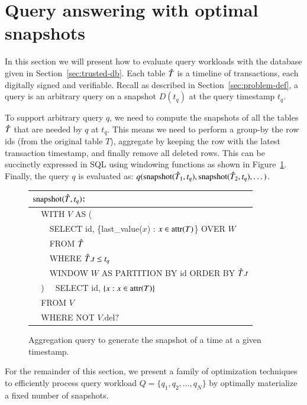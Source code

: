 \section{Query answering with optimal snapshots}

In this section we will present how to evaluate query workloads with the
database given in Section~\ref{sec:trusted-db}.  Each table $\Hat T$ is a timeline of
transactions, each digitally signed and verifiable.  Recall as described in
Section~\ref{sec:problem-def}, a query is an arbitrary query on a snapshot
$D(t_q)$ at the query timestamp $t_q$.

To support arbitrary query $q$, we need to compute the snapshots of all the tables
$\Hat{T}$ that are needed by $q$ at $t_q$. This means we need to perform
a group-by the row ids (from the original table $T$), aggregate by keeping the
row with the latest transaction timestamp, and finally remove all deleted rows.
This can be succinctly expressed in SQL using windowing functions as shown in
Figure~\ref{fig:sql}.
Finally, the query $q$ is evaluated as:
$q(\mathrm{snapshot}(\Hat T_1, t_q), \mathrm{snapshot}(\Hat T_2, t_q), \dots)$.

\begin{figure}[h]
\centering
\begin{tabular}{l} \hline \hline
$\mathrm{snapshot}(\Hat T, t_q)$: \\ \hline
\verb|  |WITH $V$ AS ( \\
\verb|    |SELECT id, \{last\_value($x$) : $x\in\mathrm{attr}(T)$\} OVER $W$ \\
\verb|    |FROM $\Hat T$ \\
\verb|    |WHERE $\Hat T.t \leq t_q$ \\
\verb|    |WINDOW $W$ AS PARTITION BY id ORDER BY $\Hat T.t$ \\
\verb|  |)
\verb|  |SELECT id, $\{x: x\in\mathrm{attr}(T)\}$ \\
\verb|  |FROM $V$ \\
\verb|  |WHERE NOT $V.\mathrm{del?}$ \\ \hline \hline
\end{tabular}
\caption{Aggregation query to generate the snapshot of a time at a given
timestamp.}
\label{fig:sql}
\end{figure}

For the remainder of this section, we present a family of optimization
techniques to efficiently process query workload $Q = \{q_1, q_2, \dots, q_N\}$
by optimally materialize a fixed number of snapshots.



